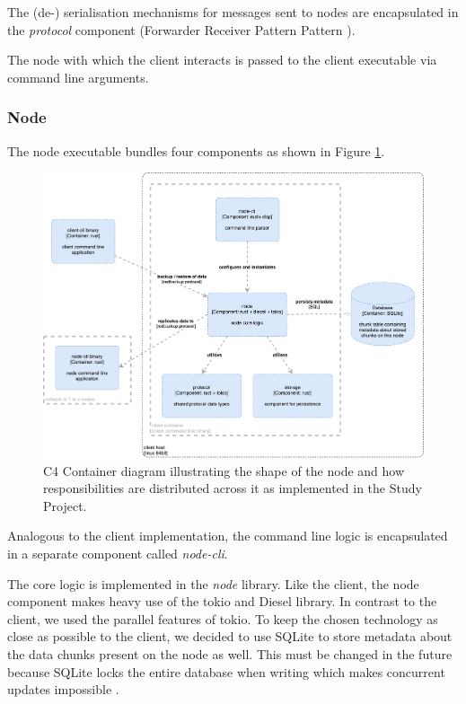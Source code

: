 The (de-) serialisation mechanisms for messages sent to \glspl{node} are encapsulated in the \emph{protocol} component (Forwarder Receiver Pattern Pattern \cite{POSA1}).

The \gls{node} with which the \gls{client} interacts is passed to the client executable via command line arguments.


\subsubsection{Node}

The node executable bundles four components as shown in Figure \ref{fig:c4-node-container}.  

\begin{figure}[h]
	\centering
	\includegraphics[width=1\linewidth]{resources/c4-node-container}
	\caption[Node specific C4 Container diagram]{C4 Container diagram illustrating the shape of the node and how responsibilities are distributed across it as implemented in the Study Project.}
	\label{fig:c4-node-container}
\end{figure}

Analogous to the client implementation, the command line logic is encapsulated in a separate component called \emph{node-cli}.

The core logic is implemented in the \emph{node} library. Like the client, the node component makes heavy use of the tokio and Diesel library. In contrast to the client, we used the parallel features of tokio. To keep the chosen technology as close as possible to the client, we decided to use SQLite to store metadata about the data \glspl{chunk} present on the node as well. This must be changed in the future because SQLite locks the entire database when writing which makes concurrent updates impossible \cite{sqlite-locking}.

